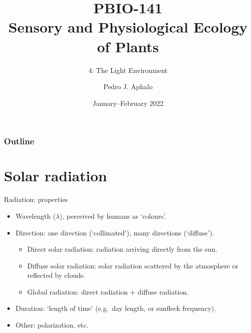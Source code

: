 \documentclass[10pt]{beamer}\usepackage[]{graphicx}\usepackage[]{color}
\begin{document}
\title{PBIO-141\\Sensory and Physiological Ecology of  Plants}
\subtitle{4: The Light Environment}
\author{Pedro J. Aphalo}
\date{January--February 2022}

  \begin{frame}
    \maketitle
  \end{frame}



  \begin{frame}
    \frametitle{Outline}
    \tableofcontents
  \end{frame}

\section{Solar radiation}

\begin{frame}{Radiation: properties}
    \begin{itemize}
        \item Wavelength ($\lambda$), perceived by humans as `colours'.
        \item Direction: one direction (`collimated'), many directions (`diffuse').
        \begin{itemize}
            \item Direct solar radiation: radiation arriving directly from the
            sun.
            \item Diffuse solar radiation: solar radiation scattered by the
            atmosphere or reflected by clouds.
            \item Global radiation: direct radiation + diffuse radiation.
        \end{itemize}
        \item Duration: `length of time' (e.g.\ day length, or sunfleck frequency).
        \item Other: polarization, etc.
    \end{itemize}
\end{frame}
\end{document}
